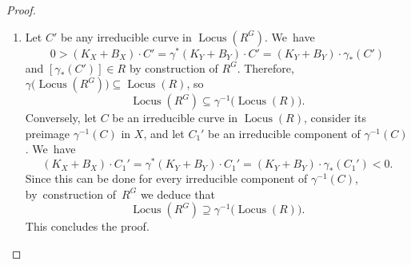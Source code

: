 \documentclass[JEP,XML,SOM,Unicode,published]{cedram}
\theoremstyle{plain}
\theoremstyle{definition}
\DeclareMathOperator{\Locus}{Locus}
\begin{document}
\begin{proof}
\begin{enumerate}
Suppose now that the ray $R$ is spanned by the class of an irreducible curve $C$ in~$Y$. Let $C'$ be an irreducible curve in $X$ mapping onto $C$. Then the class $\beta$ of the $1$\nobreakdash-cycle $\sum_{g \in G} g(C')$ is $G$\nobreakdash-invariant and maps to an element of $R$ under $\gamma_*$. Thus, by~the argument above, $\beta$ spans the extremal ray $R^G$ constructed above.

\item
Let $C'$ be any irreducible curve in $\Locus \left(R^G \right)$. We~have
\[
0 > (K_X+B_X) \cdot C' = \gamma^*(K_Y+B_Y) \cdot C' =(K_Y+B_Y) \cdot \gamma_*(C')
\]
and $[\gamma_* (C')] \in R$ by construction of $R^G$.
Therefore, $\gamma\bigl(\Locus(R^G) \bigr) \subseteq \Locus(R)$, so~\[
\Locus \left(R^G \right) \subseteq \gamma^{-1} \bigl(\Locus(R) \bigr).
\]
Conversely, let $C$ be an irreducible curve in $\Locus(R)$, consider its preimage $\gamma^{-1}(C)$ in $X$, and let $C_1'$ be an irreducible component of $\gamma^{-1}(C)$. We~have
\[
(K_X+B_X) \cdot C_1' = \gamma^*(K_Y+B_Y) \cdot C_1' = (K_Y+B_Y) \cdot \gamma_*(C_1') < 0.
\]
Since this can be done for every irreducible component of $\gamma^{-1}(C)$, by~construction of~$R^G$ we deduce that
\[
\Locus \left(R^G \right) \supseteq \gamma^{-1} \bigl(\Locus(R) \bigr).
\]
This concludes the proof.\qedhere
\end{enumerate}
\end{proof}
\end{document}
